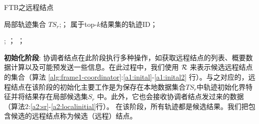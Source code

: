 \begin{algorithm}[t]
	\caption{FTB之远程结点}
	\label{alg:frame1-remote}
	\begin{algorithmic}[1]
		\REQUIRE 局部轨迹集合 $TS_{r}$;；
		\ENSURE 属于top-$k$结果集的轨迹ID；
		
		 \label{a2:m2Info}
		 ;
			\label{a2:gkub}
		\RETURN；	\label{a2:sendbreak} 
		\ENDIF
		\ELSE %
		\RETURN	； \label{a2:localreturn}
		\ENDIF
		\ENDWHILE
	\end{algorithmic}
\end{algorithm}

\textbf{初始化阶段}: 协调者结点在此阶段执行多种操作，如获取远程结点的列表、概要数据计算以及可能预发送一些信息。在此过程中，我们使用
$\cal R$ 来表示候选远程结点的集合（算法 \ref{alg:frame1-coordinator}:\ref{a1:inital}-\ref{a1:inital2}  行）。与之对应的，远程结点在该阶段的初始化主要工作是为保存在本地数据集合$TS_{r}$中轨迹初始化界特征并将结果存在局部候选集$S_{r}$ 中。此外，它也会接收协调者结点发过来的数据（算法2:\ref{a2:sr}-\ref{a2:localinitial}行）。
在该阶段，所有轨迹都是候选结果。我们把包含候选的远程结点称为候选（远程）结点。


